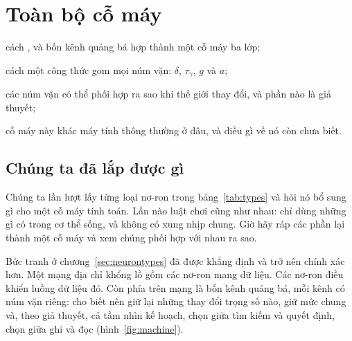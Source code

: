 \chapter{Toàn bộ cỗ máy}
\label{sec:synthesis}
\begin{chaptergoals}
\item cách ,  và bốn kênh quảng bá hợp thành một cỗ máy ba lớp;
\item cách một công thức gom mọi núm vặn: $\delta$, $\tau_\gamma$, $g$ và $a$;
\item các núm vặn có thể phối hợp ra sao khi thế giới thay đổi, và phần nào là giả thuyết;
\item cỗ máy này khác máy tính thông thường ở đâu, và điều gì về nó còn chưa biết.
\end{chaptergoals}

\section{Chúng ta đã lắp được gì}

Chúng ta lần lượt lấy từng loại nơ-ron trong bảng~\ref{tab:types} và hỏi nó bổ sung gì cho một cỗ máy tính toán. Lần nào luật chơi cũng như nhau: chỉ dùng những gì có trong cơ thể sống, và không có xung nhịp chung. Giờ hãy ráp các phần lại thành một cỗ máy và xem chúng phối hợp với nhau ra sao.

Bức tranh ở chương~\ref{sec:neurontypes} đã được khẳng định và trở nên chính xác hơn. Một mạng địa chỉ khổng lồ gồm các nơ-ron  mang dữ liệu. Các nơ-ron  điều khiển luồng dữ liệu đó. Còn phía trên mạng là bốn kênh quảng bá, mỗi kênh có núm vặn riêng:  cho biết nên giữ lại những thay đổi trọng số nào,  giữ mức chung và, theo giả thuyết, cả tầm nhìn kế hoạch,  chọn giữa tìm kiếm và quyết định,  chọn giữa ghi và đọc (hình~\ref{fig:machine}).

